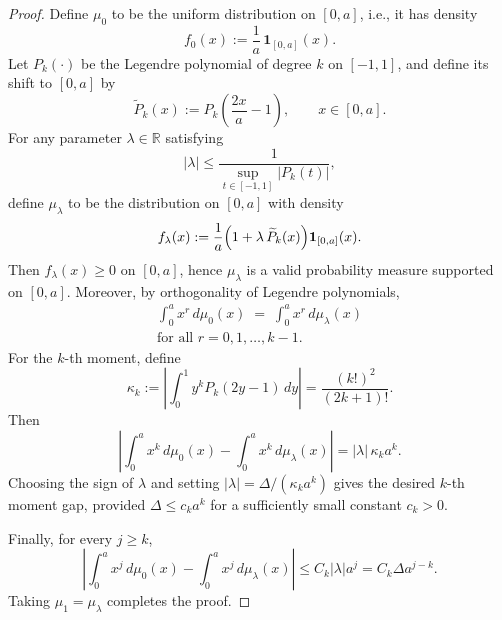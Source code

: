 \documentclass[aps,prx,reprint,superscriptaddress,amsmath,amssymb,longbibliography,floatfix]{revtex4-2}
\theoremstyle{plain}
\theoremstyle{definition}
\theoremstyle{remark}
\begin{document}
\begin{proof}
Define $\mu_0$ to be the uniform distribution on $[0,a]$, i.e., it has density
\begin{equation*}
    f_0(x) := \frac{1}{a}\,\mathbf{1}_{[0,a]}(x).
\end{equation*}
Let $P_k(\cdot)$ be the Legendre polynomial of degree $k$ on $[-1,1]$, and define its shift to $[0,a]$ by
\begin{equation*}
    \widetilde{P}_k(x) := P_k\!\left(\frac{2x}{a}-1\right),\qquad x\in[0,a].
\end{equation*}
For any parameter $\lambda\in\mathbb{R}$ satisfying
\begin{equation*}
    |\lambda|\le \frac{1}{\sup_{t\in[-1,1]}|P_k(t)|},
\end{equation*}
define $\mu_\lambda$ to be the distribution on $[0,a]$ with density
\begin{equation}
    f_\lambda(x) := \frac{1}{a}\Bigl(1+\lambda\,\widetilde{P}_k(x)\Bigr)\mathbf{1}_{[0,a]}(x).
\label{eq:app-legendre-perturbed-density}
\end{equation}
Then $f_\lambda(x)\ge 0$ on $[0,a]$, hence $\mu_\lambda$ is a valid probability measure supported on $[0,a]$.
Moreover, by orthogonality of Legendre polynomials,
\begin{equation*}
\begin{gathered}
\int_0^a x^r\, d\mu_0(x) \;=\; \int_0^a x^r\, d\mu_\lambda(x)
    \\ \text{for all } r=0,1,\dots,k-1.
\end{gathered}
\end{equation*}
For the $k$-th moment, define
\begin{equation}
    \kappa_k
    :=
    \left|
    \int_0^1 y^k P_k(2y-1)\,dy
    \right|
    =
    \frac{(k!)^2}{(2k+1)!}.
\label{eq:app-legendre-moment-normalization}
\end{equation}
Then
\begin{equation*}
\left|
\int_0^a x^k\, d\mu_0(x)
-
\int_0^a x^k\, d\mu_\lambda(x)
\right|
=
|\lambda|\,\kappa_k a^k.
\end{equation*}
Choosing the sign of $\lambda$ and setting $|\lambda|=\Delta/(\kappa_k a^k)$ gives the desired $k$-th moment gap, provided $\Delta\le c_k a^k$ for a sufficiently small constant $c_k>0$.

Finally, for every $j\ge k$,
\begin{equation*}
\left|
\int_0^a x^j\, d\mu_0(x)
-
\int_0^a x^j\, d\mu_\lambda(x)
\right|
\le
C_k|\lambda|a^j
=
C_k\Delta a^{j-k}.
\end{equation*}
Taking $\mu_1=\mu_\lambda$ completes the proof.
\end{proof}
\end{document}
